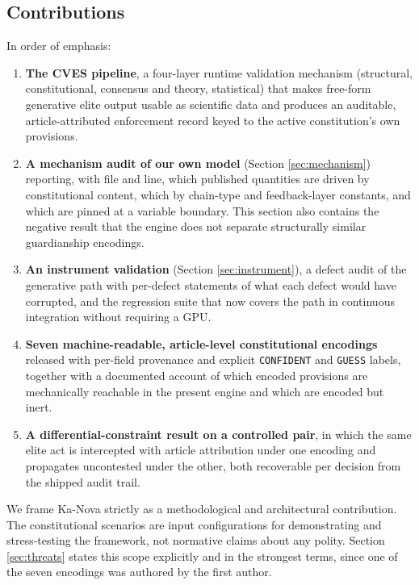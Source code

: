\documentclass{ieeeaccess}
\begin{document}
\subsection{Contributions}
In order of emphasis:

\begin{enumerate}
\item \textbf{The CVES pipeline}, a four-layer runtime validation
mechanism (structural, constitutional, consensus and theory,
statistical) that makes free-form generative elite output usable as
scientific data and produces an auditable, article-attributed
enforcement record keyed to the active constitution's own provisions.
\item \textbf{A mechanism audit of our own model} (Section
\ref{sec:mechanism}) reporting, with file and line, which published
quantities are driven by constitutional content, which by chain-type and
feedback-layer constants, and which are pinned at a variable boundary.
This section also contains the negative result that the engine does not
separate structurally similar guardianship encodings.
\item \textbf{An instrument validation} (Section \ref{sec:instrument}),
a defect audit of the generative path with per-defect statements of what
each defect would have corrupted, and the regression suite that now
covers the path in continuous integration without requiring a GPU.
\item \textbf{Seven machine-readable, article-level constitutional
encodings} released with per-field provenance and explicit
\texttt{CONFIDENT} and \texttt{GUESS} labels, together with a documented
account of which encoded provisions are mechanically reachable in the
present engine and which are encoded but inert.
\item \textbf{A differential-constraint result on a controlled pair},
in which the same elite act is intercepted with article attribution
under one encoding and propagates uncontested under the other, both
recoverable per decision from the shipped audit trail.
\end{enumerate}

We frame Ka-Nova strictly as a methodological and architectural
contribution. The constitutional scenarios are input configurations for
demonstrating and stress-testing the framework, not normative claims
about any polity. Section \ref{sec:threats} states this scope
explicitly and in the strongest terms, since one of the seven encodings
was authored by the first author.
\end{document}
